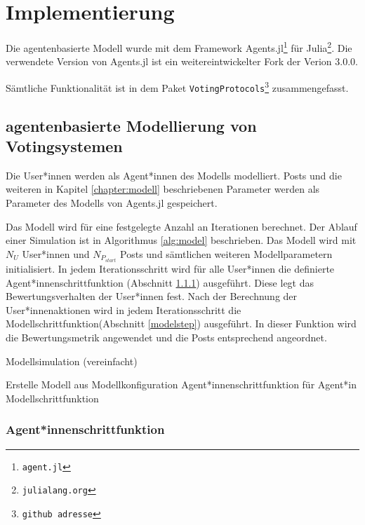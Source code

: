 \chapter{Implementierung}

Die agentenbasierte Modell wurde mit dem Framework Agents.jl\footnote{\texttt{agent.jl}} für Julia\footnote{\texttt{julialang.org}}. Die verwendete Version von Agents.jl ist ein weitereintwickelter Fork der Verion 3.0.0.
	
Sämtliche Funktionalität ist in dem Paket \texttt{VotingProtocols}\footnote{\texttt{github adresse}} zusammengefasst.

\section{agentenbasierte Modellierung von Votingsystemen}

Die User*innen werden als Agent*innen des Modells modelliert. Posts und die weiteren in Kapitel \ref{chapter:modell} beschriebenen Parameter werden als Parameter des Modells von Agents.jl gespeichert. 

Das Modell wird für eine festgelegte Anzahl an Iterationen berechnet. Der Ablauf einer Simulation ist in Algorithmus \ref{alg:model} beschrieben. Das Modell wird mit $N_U$ User*innen und $N_{P_{start}}$ Posts und sämtlichen weiteren Modellparametern initialisiert. In jedem Iterationsschritt wird für alle User*innen die definierte Agent*innenschrittfunktion (Abschnitt \ref{agentstep}) ausgeführt. Diese legt das Bewertungsverhalten der User*innen fest. Nach der Berechnung der User*innenaktionen wird in jedem Iterationsschritt die Modellschrittfunktion(Abschnitt \ref{modelstep}) ausgeführt. In dieser Funktion wird die Bewertungsmetrik angewendet und die Posts entsprechend angeordnet.


\begin{algorithm}
	\label{alg:model}
	\caption{Modellsimulation (vereinfacht)}
	\begin{algorithmic}
			\State Erstelle Modell aus Modellkonfiguration
					\State Agent*innenschrittfunktion für Agent*in
				\EndFor
				\State Modellschrittfunktion
			\EndFor
	\end{algorithmic}
\end{algorithm}

\subsection{Agent*innenschrittfunktion}
\label{agentstep}


